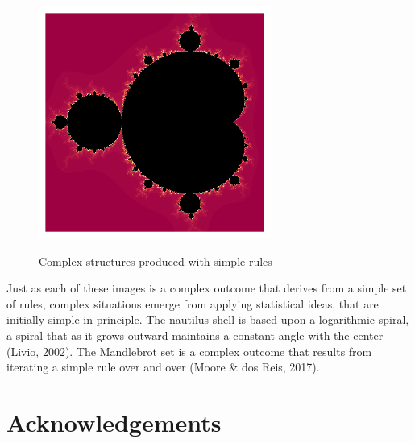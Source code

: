 \documentclass[
  letterpaper,
  DIV=11,
  numbers=noendperiod]{scrreprt}
\begin{document}
\begin{tcolorbox}
\begin{figure}[H]
\begin{minipage}{0.50\linewidth}
\includegraphics[width=\textwidth,height=3in]{mandelbrot.png}

\end{minipage}%
\newline
\begin{minipage}{0.50\linewidth}
Complex structures produced with simple rules\end{minipage}%

\end{figure}%

Just as each of these images is a complex outcome that derives from a
simple set of rules, complex situations emerge from applying statistical
ideas, that are initially simple in principle. The nautilus shell is
based upon a logarithmic spiral, a spiral that as it grows outward
maintains a constant angle with the center (Livio, 2002). The Mandlebrot
set is a complex outcome that results from iterating a simple rule over
and over (Moore \& dos Reis, 2017).

\end{tcolorbox}


\chapter*{Acknowledgements}\label{acknowledgements}

\end{document}
